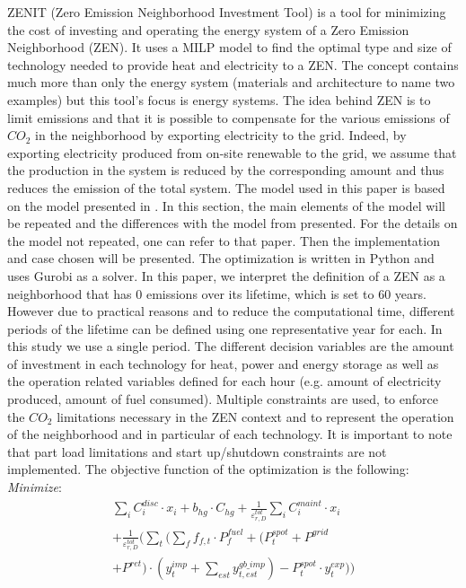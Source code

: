 \documentclass[conference]{IEEEtran}
\begin{document}
ZENIT (Zero Emission Neighborhood Investment Tool) is a tool for minimizing the cost of investing and operating the energy system of a Zero Emission Neighborhood (ZEN). It uses a MILP model to find the optimal type and size of technology needed to provide heat and electricity to a ZEN.
The concept contains much more than only the energy system (materials and architecture to name two examples) but this tool's focus is energy systems.
The idea behind ZEN is to limit emissions and that it is possible to compensate for the various emissions of $CO_2$ in the neighborhood by exporting electricity to the grid. Indeed, by exporting electricity produced from on-site renewable to the grid, we assume that the production in the system is reduced by the corresponding amount and thus reduces the emission of the total system.
The model used in this paper is based on the model presented in . In this section, the main elements of the model will be repeated and the differences with the model from  presented. For the details on the model not repeated, one can refer to that paper. Then the implementation and case chosen will be presented.
The optimization is written in Python and uses Gurobi as a solver. In this paper, we interpret the definition of a ZEN as a neighborhood that has 0 emissions over its lifetime, which is set to 60 years. However due to practical reasons and to reduce the computational time, different periods of the lifetime can be defined using one representative year for each. In this study we use a single period.
The different decision variables are the amount of investment in each technology for heat, power and energy storage as well as the operation related variables defined for each hour (e.g. amount of electricity produced, amount of fuel consumed).
Multiple constraints are used, to enforce the $CO_2$ limitations necessary in the ZEN context and to represent the operation of the neighborhood and in particular of each technology. It is important to note that part load limitations and start up/shutdown constraints are not implemented.
The objective function of the optimization is the following:
\textit{Minimize}:
\begin{multline}
    \sum_{i} C_i^{disc}\cdot x_i + b_{hg} \cdot C_{hg} + \frac{1}{\varepsilon^{tot}_{r,D}} \sum_{i} C_i^{maint} \cdot x_i\\+\frac{1}{\varepsilon^{tot}_{r,D}}\bigg(\sum_{t}\Big(\sum_{f}f_{f,t}\cdot P_{f}^{fuel} + (P_{t}^{spot}+P^{grid}\\+P^{ret})\cdot (y_{t}^{imp}+\sum_{est}y_{t,est}^{gb\_imp})-P_{t}^{spot}\cdot y_{t}^{exp}\Big)\bigg)
\end{multline}
\end{document}
